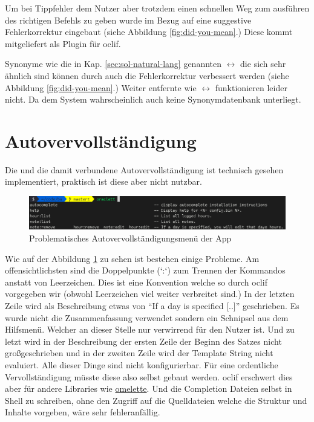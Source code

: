 \documentclass[oneside,bibliography=totocnumbered,BCOR=5mm]{scrbook}
\begin{document}
Um bei Tippfehler dem Nutzer aber trotzdem einen schnellen Weg zum ausführen des
richtigen Befehls zu geben wurde im Bezug auf  eine suggestive
Fehlerkorrektur eingebaut (siehe Abbildung \ref{fig:did-you-mean}.) Diese kommt
mitgeliefert als Plugin für oclif.

Synonyme wie die in Kap. \ref{sec:sol-natural-lang} genannten 
$\leftrightarrow$  die sich sehr ähnlich sind können
durch auch die Fehlerkorrektur verbessert werden (siehe Abbildung
\ref{fig:did-you-mean}.) Weiter entfernte wie 
$\leftrightarrow$  funktionieren leider nicht. Da dem System
wahrscheinlich auch keine Synonymdatenbank unterliegt.

\section{Autovervollständigung}
\label{sec:impl-autocomplete}

Die  und die damit verbundene Autovervollständigung ist
technisch gesehen implementiert, praktisch ist diese aber nicht nutzbar.

\begin{figure}
  \centering
  \includegraphics[scale=0.5]{apps-autocomplete.png}
  \caption{Problematisches Autovervollständigungsmenü der App}
  \label{fig:apps-autocomplete}
\end{figure}

Wie auf der Abbildung \ref{fig:apps-autocomplete} zu sehen ist bestehen einige
Probleme. Am offensichtlichsten sind die Doppelpunkte (`:`) zum Trennen
der Kommandos anstatt von Leerzeichen. Dies ist eine Konvention welche
so durch oclif vorgegeben wir (obwohl Leerzeichen viel weiter verbreitet
sind.) In der letzten Zeile wird als Beschreibung etwas von ``If a day is
specified [..]'' geschrieben. Es wurde nicht die Zusammenfassung verwendet
sondern ein Schnipsel aus dem Hilfsmenü. Welcher an dieser Stelle nur
verwirrend für den Nutzer ist. Und zu letzt wird in der Beschreibung der
ersten Zeile der Beginn des Satzes nicht großgeschrieben und in der zweiten
Zeile wird der Template String nicht evaluiert. Alle dieser Dinge sind nicht
konfigurierbar. Für eine ordentliche Vervollständigung müsste diese also
selbst gebaut werden. oclif erschwert dies aber für andere Libraries wie
\href{https://github.com/f/omelette/issues/52}{omelette}. Und die Completion
Dateien selbst in Shell zu schreiben, ohne den Zugriff auf die Quelldateien
welche die Struktur und Inhalte vorgeben, wäre sehr fehleranfällig.
\end{document}
